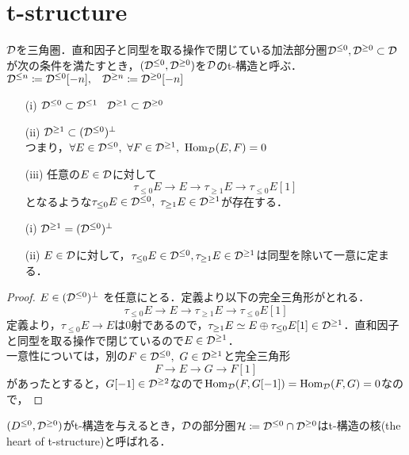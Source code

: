 \section{t-structure}
\begin{defn}\cite{BBD}
		${\mathcal D}$を三角圏．直和因子と同型を取る操作で閉じている加法部分圏${\mathcal D}^{\le 0},{\mathcal D}^{\ge 0}\subset{\mathcal D}$が次の条件を満たすとき，$({\mathcal D}^{\le 0},{\mathcal D}^{\ge 0})$を${\mathcal D}$のt-構造と呼ぶ．
		${\mathcal D}^{\le n}\coloneq{\mathcal D}^{\le 0}[-n],\hspace{3mm}{\mathcal D}^{\ge n}\coloneq{\mathcal D}^{\ge 0}[-n] $
		\begin{itemize}
			\item[(i)]
				${\mathcal D}^{\le 0}\subset{\mathcal D}^{\le 1}\hspace{3mm}{\mathcal D}^{\ge 1}\subset{\mathcal D}^{\ge 0} $
			\item[(ii)]
				${\mathcal D}^{\ge 1}\subset ({\mathcal D}^{\le 0})^\perp$\\
				つまり，$\forall E\in {\mathcal D}^{\le 0},\ \forall F\in{\mathcal D}^{\ge 1},\ \operatorname{\mathrm{Hom}}_{{\mathcal D}}(E,F)=0$
			\item[(iii)]
				任意の$E\in{\mathcal D}$に対して
				\[\tau_{\le 0}E\rightarrow E \rightarrow \tau_{\ge 1}E\rightarrow \tau_{\le 0}E[1]\]
				となるような$\tau_{\le 0}E\in\D^{\le 0},\ \tau_{\ge 1}E\in\D^{\ge 1}$が存在する．
		\end{itemize}
\end{defn}

\begin{lemm}
		\begin{itemize}
				\item[(i)]${\mathcal D}^{\ge 1}=({\mathcal D}^{\le 0})^{\perp}$
				\item[(ii)]$E\in{\mathcal D}$に対して，$\tau_{\le 0}E\in{\mathcal D}^{\le 0}, \tau_{\ge 1}E\in{\mathcal D}^{\ge 1}$は同型を除いて一意に定まる．
		\end{itemize}
\end{lemm}
	\begin{proof}
		$E\in\mathcal ({\mathcal D}^{\le 0})^\perp$ を任意にとる．定義より以下の完全三角形がとれる．
				\[\tau_{\le 0}E\rightarrow E \rightarrow \tau_{\ge 1}E\rightarrow \tau_{\le 0}E[1]\]
				定義より，$\tau_{\le 0}E\rightarrow E$は0射であるので，$\tau_{\ge 1}E\simeq E\oplus\tau_{\le 0}E[1]\in {\mathcal D}^{\ge 1}$．直和因子と同型を取る操作で閉じているので$E\in{\mathcal D}^{\ge 1}$．\\
				一意性については，別の$F\in\D^{\le 0},\ G\in\D^{\ge 1}$と完全三角形
				\[F\rightarrow E \rightarrow G\rightarrow F[1]\]
				があったとすると，$G[-1]\in{\mathcal D}^{\ge 2}$なので$\operatorname{\mathrm{Hom}}_{{\mathcal D}}(F,G[-1])=\operatorname{\mathrm{Hom}}_{{\mathcal D}}(F,G)=0$なので，
\end{proof}
\begin{defn}\cite{BBD}
	$(D^{\le 0},{\mathcal D}^{\ge 0})$がt-構造を与えるとき，${\mathcal D}$の部分圏${\mathcal H}\coloneq{\mathcal D}^{\le 0}\cap{\mathcal D}^{\ge 0}$はt-構造の核(the heart of t-structure)と呼ばれる．
\end{defn}

